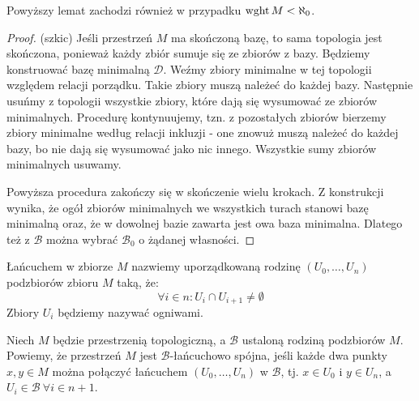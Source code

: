 \begin{fact}
  Powyższy lemat zachodzi również w przypadku $\operatorname{wght} M < \aleph_0$.
  \begin{proof}(szkic)
    Jeśli przestrzeń $M$ ma skończoną bazę, to sama topologia jest skończona, ponieważ każdy zbiór sumuje się ze zbiorów z bazy. Będziemy konstruować bazę minimalną $\mathcal D$. Weźmy zbiory minimalne w tej topologii względem relacji porządku. Takie zbiory muszą należeć do każdej bazy. Następnie usuńmy z topologii wszystkie zbiory, które dają się wysumować ze zbiorów minimalnych. Procedurę kontynuujemy, tzn. z pozostałych zbiorów bierzemy zbiory minimalne według relacji inkluzji - one znowuż muszą należeć do każdej bazy, bo nie dają się wysumować jako nic innego. Wszystkie sumy zbiorów minimalnych usuwamy.
    
    Powyższa procedura zakończy się w skończenie wielu krokach. Z konstrukcji wynika, że ogół zbiorów minimalnych we wszystkich turach stanowi bazę minimalną oraz, że w dowolnej bazie zawarta jest owa baza minimalna. Dlatego też z $\mathcal B$ można wybrać $\mathcal B_0$ o żądanej własności.
  \end{proof}
\end{fact}
 
\begin{df}
  Łańcuchem w zbiorze $M$ nazwiemy uporządkowaną rodzinę $(U_0, \ldots, U_n)$ podzbiorów zbioru $M$ taką, że:
  \[
    \forall i \in n: U_i \cap U_{i+1} \neq \emptyset
  \]
  Zbiory $U_i$ będziemy nazywać ogniwami.
\end{df}
 
\begin{df}
  Niech $M$ będzie przestrzenią topologiczną, a $\mathcal B$ ustaloną rodziną podzbiorów $M$. Powiemy, że przestrzeń $M$ jest $\mathcal B$-łańcuchowo spójna, jeśli każde dwa punkty $x,y \in M$ można połączyć łańcuchem $(U_0, \ldots, U_n)$ w $\mathcal B$, tj. $x \in U_0$ i $y \in U_n$, a $U_i \in \mathcal B\ \forall i \in n+1$.
\end{df}
 
